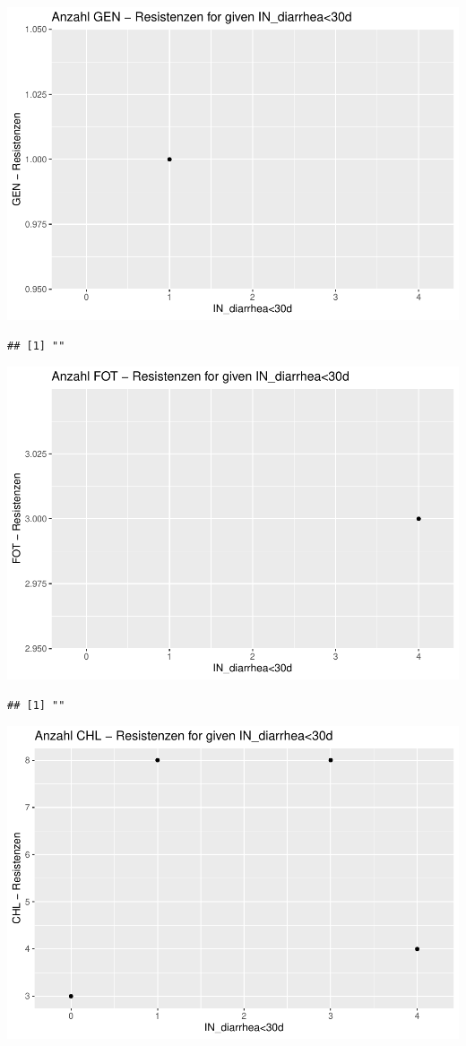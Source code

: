 \documentclass[
]{article}
\begin{document}
\includegraphics{NResistenzen_files/figure-latex/numerical_variables-34.pdf}

\begin{verbatim}
## [1] ""
\end{verbatim}

\includegraphics{NResistenzen_files/figure-latex/numerical_variables-35.pdf}

\begin{verbatim}
## [1] ""
\end{verbatim}

\includegraphics{NResistenzen_files/figure-latex/numerical_variables-36.pdf}
\end{document}
